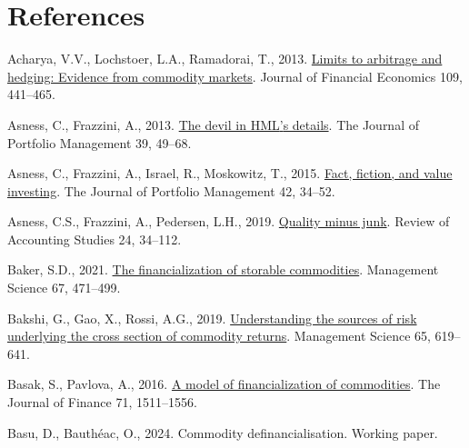 \documentclass[]{elsarticle} %
\newlength{\cslhangindent}
\newlength{\cslentryspacingunit} %
\newenvironment{CSLReferences}[2] %
 {%
  \setlength{\parindent}{0pt}
  \ifodd #1
  \let\oldpar\par
  \def\par{\hangindent=\cslhangindent\oldpar}
  \fi
  \setlength{\parskip}{#2\cslentryspacingunit}
 }%
 {}
\begin{document}
\newpage

\hypertarget{references}{%
\section*{References}\label{references}}

\hypertarget{refs}{}
\begin{CSLReferences}{1}{0}
\leavevmode{}%
Acharya, V.V., Lochstoer, L.A., Ramadorai, T., 2013. \href{https://doi.org/10.1016/j.jfineco.2013.03.003}{Limits to arbitrage and hedging: Evidence from commodity markets}. Journal of Financial Economics 109, 441--465.

\leavevmode{}%
Asness, C., Frazzini, A., 2013. \href{https://doi.org/10.3905/jpm.2013.39.4.049}{The devil in HML{'}s details}. The Journal of Portfolio Management 39, 49--68.

\leavevmode{}%
Asness, C., Frazzini, A., Israel, R., Moskowitz, T., 2015. \href{https://doi.org/10.3905/jpm.2015.42.1.034}{Fact, fiction, and value investing}. The Journal of Portfolio Management 42, 34--52.

\leavevmode{}%
Asness, C.S., Frazzini, A., Pedersen, L.H., 2019. \href{https://doi.org/10.1007/s11142-018-9470-2}{Quality minus junk}. Review of Accounting Studies 24, 34--112.

\leavevmode{}%
Baker, S.D., 2021. \href{https://doi.org/10.1287/mnsc.2019.3445}{The financialization of storable commodities}. Management Science 67, 471--499.

\leavevmode{}%
Bakshi, G., Gao, X., Rossi, A.G., 2019. \href{https://doi.org/10.1287/mnsc.2017.2840}{Understanding the sources of risk underlying the cross section of commodity returns}. Management Science 65, 619--641.

\leavevmode{}%
Basak, S., Pavlova, A., 2016. \href{https://doi.org/10.1111/jofi.12408}{A model of financialization of commodities}. The Journal of Finance 71, 1511--1556.

\leavevmode{}%
Basu, D., Bauthéac, O., 2024. Commodity definancialisation. Working paper.


\end{CSLReferences}
\end{document}
